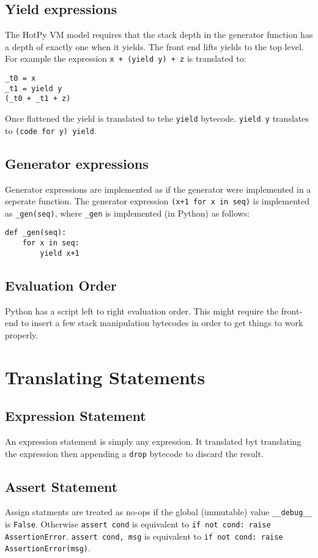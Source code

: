 \documentclass[a4paper,10pt]{article}
\begin{document}
\subsection{Yield expressions}
The HotPy VM model requires that the stack depth in the generator function has a depth of exactly one when it yields.
The front end lifts yields to the top level. For example the expression \verb|x + (yield y) + z| is translated to:
\begin{verbatim}
_t0 = x
_t1 = yield y
(_t0 + _t1 + z)
\end{verbatim}
Once flattened the yield is translated to tehe \verb|yield| bytecode. \verb|yield y| translates to \verb|(code for y) yield|.

\subsection{Generator expressions}
Generator expressions are implemented as if the generator were implemented in a seperate function.
The generator expression \verb|(x+1 for x in seq)| is implemented as \verb|_gen(seq)|, where \verb|_gen| is implemented (in Python) as follows:
\begin{verbatim}
def _gen(seq):
    for x in seq:
        yield x+1
\end{verbatim}

\subsection{Evaluation Order}

Python has a script left to right evaluation order. This might require the front-end to insert a few stack manipulation bytecodes in order to get things to work properly.

\section{Translating Statements}

\subsection{Expression Statement}
An expression statement is simply any expression. It translated byt translating the expression then appending a \verb|drop| bytecode to discard the result.
\subsection{Assert Statement}
Assign statments are treated as no-ops if the global (immutable) value \verb|__debug__| is \verb|False|.
Otherwise \verb|assert cond| is equivalent to \verb|if not cond: raise AssertionError|.
\verb|assert cond, msg| is equivalent to \verb|if not cond: raise AssertionError(msg)|.
\end{document}
